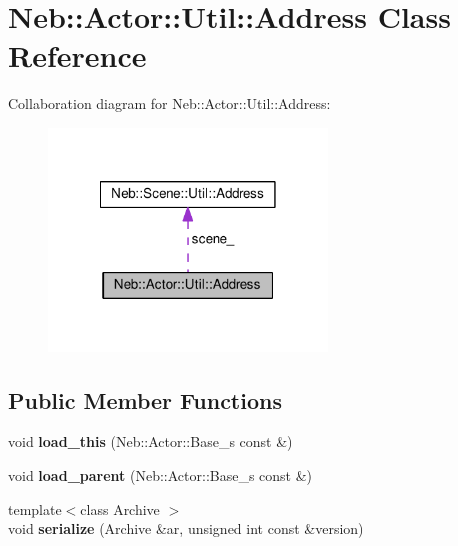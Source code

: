 \hypertarget{classNeb_1_1Actor_1_1Util_1_1Address}{\section{Neb\-:\-:Actor\-:\-:Util\-:\-:Address Class Reference}
\label{classNeb_1_1Actor_1_1Util_1_1Address}
}


Collaboration diagram for Neb\-:\-:Actor\-:\-:Util\-:\-:Address\-:
\nopagebreak
\begin{figure}[H]
\begin{center}
\leavevmode
\includegraphics[width=210pt]{classNeb_1_1Actor_1_1Util_1_1Address__coll__graph}
\end{center}
\end{figure}
\subsection*{Public Member Functions}
\begin{DoxyCompactItemize}
\item 
\hypertarget{classNeb_1_1Actor_1_1Util_1_1Address_a888b40b0cd946b66bd3300d98d8edd0a}{void {\bfseries load\-\_\-this} (Neb\-::\-Actor\-::\-Base\-\_\-s const \&)}\label{classNeb_1_1Actor_1_1Util_1_1Address_a888b40b0cd946b66bd3300d98d8edd0a}

\item 
\hypertarget{classNeb_1_1Actor_1_1Util_1_1Address_a53a152cf8e0189b0afb2d2295c0886dc}{void {\bfseries load\-\_\-parent} (Neb\-::\-Actor\-::\-Base\-\_\-s const \&)}\label{classNeb_1_1Actor_1_1Util_1_1Address_a53a152cf8e0189b0afb2d2295c0886dc}

\item 
\hypertarget{classNeb_1_1Actor_1_1Util_1_1Address_ad128a12446aadf26c8aee1f0a6df36fc}{{\footnotesize template$<$class Archive $>$ }\\void {\bfseries serialize} (Archive \&ar, unsigned int const \&version)}\label{classNeb_1_1Actor_1_1Util_1_1Address_ad128a12446aadf26c8aee1f0a6df36fc}

\end{DoxyCompactItemize}
